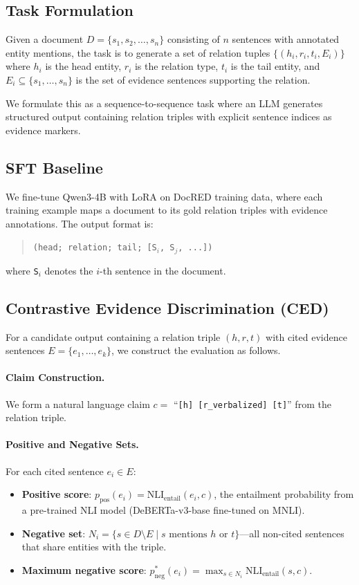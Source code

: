 \documentclass[11pt,a4paper]{article}
\begin{document}
\subsection{Task Formulation}

Given a document $D = \{s_1, s_2, \ldots, s_n\}$ consisting of $n$ sentences with annotated entity mentions, the task is to generate a set of relation tuples $\{(h_i, r_i, t_i, E_i)\}$ where $h_i$ is the head entity, $r_i$ is the relation type, $t_i$ is the tail entity, and $E_i \subseteq \{s_1, \ldots, s_n\}$ is the set of evidence sentences supporting the relation.

We formulate this as a sequence-to-sequence task where an LLM generates structured output containing relation triples with explicit sentence indices as evidence markers.

\subsection{SFT Baseline}

We fine-tune Qwen3-4B with LoRA \cite{hu2022lora} on DocRED training data, where each training example maps a document to its gold relation triples with evidence annotations. The output format is:
\begin{quote}
\texttt{(head; relation; tail; [S$_i$, S$_j$, ...])}
\end{quote}
where \texttt{S$_i$} denotes the $i$-th sentence in the document.

\subsection{Contrastive Evidence Discrimination (CED)}

For a candidate output containing a relation triple $(h, r, t)$ with cited evidence sentences $E = \{e_1, \ldots, e_k\}$, we construct the evaluation as follows.

\paragraph{Claim Construction.} We form a natural language claim $c = $ ``\texttt{[h] [r\_verbalized] [t]}'' from the relation triple.

\paragraph{Positive and Negative Sets.} For each cited sentence $e_i \in E$:
\begin{itemize}
    \item \textbf{Positive score}: $p_{\text{pos}}(e_i) = \text{NLI}_{\text{entail}}(e_i, c)$, the entailment probability from a pre-trained NLI model (DeBERTa-v3-base fine-tuned on MNLI).
    \item \textbf{Negative set}: $N_i = \{s \in D \setminus E \mid s \text{ mentions } h \text{ or } t\}$---all non-cited sentences that share entities with the triple.
    \item \textbf{Maximum negative score}: $p_{\text{neg}}^*(e_i) = \max_{s \in N_i} \text{NLI}_{\text{entail}}(s, c)$.
\end{itemize}
\end{document}
